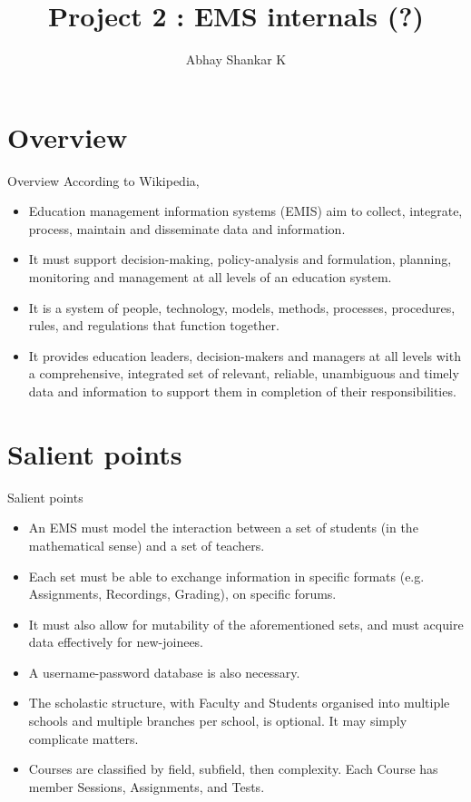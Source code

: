 \documentclass{beamer}
\begin{document}
\newcommand{\bfr}[2]{\section{#1} \begin{frame}{#1} #2 \end{frame}}

	\title{Project 2 : EMS internals (?)}
		\author{Abhay Shankar K}

	\begin{frame}
    		\titlepage 
	\end{frame}
	
	\begin{frame}
		\tableofcontents
	\end{frame}


	

	\bfr{Overview}{
		According to Wikipedia,
		\begin{itemize}
			\item Education management information systems (EMIS) aim to collect, integrate, process, maintain and disseminate data and information.
			\item It must support decision-making, policy-analysis and formulation, planning, monitoring and management at all levels of an education system. 
			\item It is a system of people, technology, models, methods, processes, procedures, rules, and regulations that function together.
			\item It provides education leaders, decision-makers and managers at all levels with a comprehensive, integrated set of relevant, reliable, unambiguous and timely data and information to support them in completion of their responsibilities.
		\end{itemize}
		}	
	
	\bfr{Salient points}{
	\begin{itemize}
		\item An EMS must model the interaction between a set of students (in the mathematical sense) and a set of teachers. 
		\item Each set must be able to exchange information in specific formats (e.g. Assignments, Recordings, Grading), on specific forums.
		\item It must also allow for mutability of the aforementioned sets, and must acquire data effectively for new-joinees.
		\item A username-password database is also necessary. 
		\item The scholastic structure, with Faculty and Students organised into multiple schools and multiple branches per school, is optional. It may simply complicate matters.
		\item Courses are classified by field, subfield, then complexity. Each Course has member Sessions, Assignments, and Tests. 
	\end{itemize}
	}
	
\end{document}
